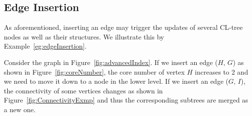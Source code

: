 \subsection{Edge Insertion}
\label{sec:edgeInsertion}

As aforementioned, inserting an edge may trigger the updates of several CL-tree nodes as well as their structures.
We illustrate this by Example~\ref{eg:edgeInsertion}.

\begin{example}
\label{eg:edgeInsertion}
Consider the graph in Figure~\ref{fig:advancedIndex}. If we insert an edge ($H$, $G$) as shown in Figure~\ref{fig:coreNumber}, the core number of vertex $H$ increases to 2 and we need to move it down to a node in the lower level. If we insert an edge ($G$, $I$), the connectivity of some vertices changes as shown in Figure~\ref{fig:ConnectivityExmp} and thus the corresponding subtrees are merged as a new one.
\end{example}

